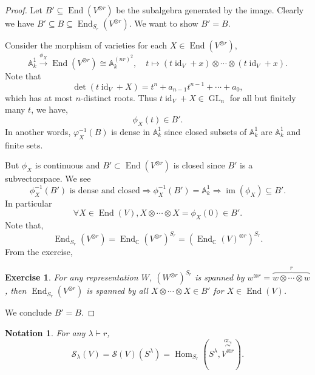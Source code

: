 \documentclass[10pt]{article}
\newtheorem{notation}{Notation}[section]
\newtheorem{exercise}{Exercise}[section]
\numberwithin{equation}{theorem}
\DeclareMathOperator{\End}{End}
\DeclareMathOperator{\GL}{GL}
\DeclareMathOperator{\Hom}{Hom}
\DeclareMathOperator{\Image}{im}
\DeclareMathOperator{\id}{id}
\newcommand{\C}[0]{\mathbb{C}}
\newcommand{\A}[0]{\mathbb{A}}
\begin{document}
\begin{proof}
  Let $B' \subseteq\End(V^{\otimes r})$ be the subalgebra generated by the image. Clearly we have $B'\subseteq B\subseteq \End_{S_r}(V^{\otimes r})$. We want to show $B' = B$.\\
  \par Consider the morphism of varieties for each $X\in\End(V^{\otimes r})$, 
  \begin{equation*}
    \A_k^1 \stackrel{\phi_X}{\to} \End(V^{\otimes r}) \cong \A_k^{(nr)^2}, \quad t\mapsto (t\id_V+x)\otimes\cdots\otimes (t\id_V+x).
  \end{equation*}
  Note that 
  \begin{equation*}
  \det(t\id_V+X) = t^n+a_{n-1}t^{n-1}+\cdots +a_0,
  \end{equation*}
  which has at most $n$-distinct roots. Thus $t\id_V+X\in\GL_n$ for all but finitely many $t$, we have,
  \begin{equation*}
    \phi_X(t)\in B'.
  \end{equation*}
  In another words, $\varphi_X^{-1}(B)$ is dense in $\A_k^1$ since closed subsets of $\A_k^1$ are $\A_k^1$ and finite sets.\\
  \par But $\phi_X$ is continuous and $B'\subset\End(V^{\otimes r})$ is closed since $B'$ is a subvectorspace. We see 
  \begin{equation*}
    \phi_X^{-1}(B')\text{ is dense and closed}\Rightarrow\phi_X^{-1}(B') = \A_k^1\Rightarrow \Image(\phi_X)\subseteq B'.
  \end{equation*} 
  In particular 
  \begin{equation*}
    \forall X\in\End(V), X\otimes\cdots\otimes X = \phi_X(0)\in B'.
  \end{equation*}
  Note that,
  \begin{equation*}
    \End_{S_r}(V^{\otimes r}) = \End_{\C}(V^{\otimes r})^{S_r} = (\End_{\C}(V)^{\otimes r})^{S_r}.
  \end{equation*}
  From the exercise, 
  \begin{exercise}
  For any representation $W$, $(W^{\otimes r})^{S_r}$ is spanned by $w^{\otimes r} = \overbrace{w\otimes \cdots \otimes w}^r$,
  then $\End_{S_r}(V^{\otimes r})$ is spanned by all $X\otimes \cdots \otimes X\in B'$ for $X\in\End(V)$. 
  \end{exercise}
  We conclude $B'=B$.
\end{proof}
\begin{notation}
For any $\lambda\vdash r$, 
\begin{equation*}
  \mathcal{S}_\lambda(V) = \mathcal{S}(V)(S^\lambda) = \Hom_{S_r}(S^\lambda,\stackrel{\stackrel{\GL_n}{\curvearrowright}}{V^{\otimes r}}).
\end{equation*}
\end{notation}
\end{document}
